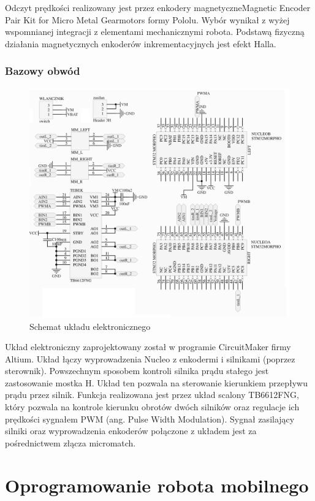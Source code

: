 \documentclass[eng,printmode]{mgr}
\begin{document}
Odczyt prędkości realizowany jest przez enkodery magnetyczneMagnetic Encoder Pair Kit for Micro Metal Gearmotors formy Pololu. Wybór wynikał z wyżej wspomnianej integracji z elementami mechanicznymi robota. Podstawą fizyczną działania magnetycznych enkoderów inkrementacyjnych jest efekt Halla.

   \subsection{Bazowy obwód}
   \begin{figure}[ht]
    \centering
    \includegraphics[width=12cm]{images/schemat_elekt}
    \caption{Schemat układu elektronicznego}
    \label{fig:schemat_elekt}
   \end{figure}

Układ elektroniczny zaprojektowany został w programie CircuitMaker firmy Altium. Układ łączy wyprowadzenia Nucleo z enkodermi i silnikami (poprzez sterownik). Powszechnym sposobem kontroli silnika prądu stałego jest zastosowanie mostka H. Układ ten pozwala na sterowanie kierunkiem przepływu prądu przez silnik. Funkcja realizowana jest przez układ scalony TB6612FNG, który pozwala na kontrole kierunku obrotów dwóch silników oraz regulacje ich prędkości sygnałem PWM (ang. Pulse Width Modulation). Sygnał zasilający silniki oraz wyprowadzenia enkoderów połączone z układem jest za pośrednictwem złącza micromatch.
\chapter{Oprogramowanie robota mobilnego}
\end{document}
